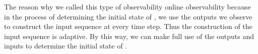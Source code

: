 The reason why we called this type of observability online observability because in the process of determining the initial state of \BCNs, we use the outputs we observe to construct the input sequence at every time step. Thus the construction of the input sequence is adaptive. By this way, we can make full use of the outputs and inputs to determine the initial state of \BCNs. %




